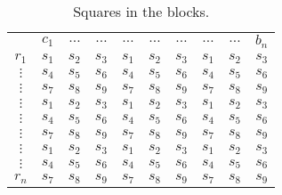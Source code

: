 \documentclass[11pt]{report}
\begin{document}
\begin{table}
\begin{center}
\begin{tabular}{ c| c c c| c c c| c c c|}
\multicolumn{1}{c}{} & $c_{1}$ &  $\dots$ & \multicolumn{1}{c}{$\dots$} & $\dots$ & $\dots$ & \multicolumn{1}{c}{$\dots$} & $\dots$ & $\dots$ & \multicolumn{1}{c}{$b_{n}$}\\ \cline{2-10}
$r_{1}$ & $s_{1}$ &  $s_{2}$ & $s_{3}$ & $s_{1}$ & $s_{2}$ & $s_{3}$ & $s_{1}$ & $s_{2}$ & $s_{3}$\\
$\vdots$ & $s_{4}$ & $s_{5}$ & $s_{6}$ & $s_{4}$ & $s_{5}$ & $s_{6}$ &  $s_{4}$ & $s_{5}$ & $s_{6}$\\
$\vdots$ & $s_{7}$ & $s_{8}$ & $s_{9}$ & $s_{7}$ & $s_{8}$ & $s_{9}$ & $s_{7}$ & $s_{8}$ & $s_{9}$\\ \cline{2-10}
$\vdots$ & $s_{1}$ &  $s_{2}$ & $s_{3}$ & $s_{1}$ & $s_{2}$ & $s_{3}$ & $s_{1}$ & $s_{2}$ & $s_{3}$\\
$\vdots$ & $s_{4}$ & $s_{5}$ & $s_{6}$ & $s_{4}$ & $s_{5}$ & $s_{6}$ &  $s_{4}$ & $s_{5}$ & $s_{6}$\\
$\vdots$ & $s_{7}$ & $s_{8}$ & $s_{9}$ & $s_{7}$ & $s_{8}$ & $s_{9}$ & $s_{7}$ & $s_{8}$ & $s_{9}$\\ \cline{2-10}
$\vdots$ & $s_{1}$ &  $s_{2}$ & $s_{3}$ & $s_{1}$ & $s_{2}$ & $s_{3}$ & $s_{1}$ & $s_{2}$ & $s_{3}$\\
$\vdots$ & $s_{4}$ & $s_{5}$ & $s_{6}$ & $s_{4}$ & $s_{5}$ & $s_{6}$ &  $s_{4}$ & $s_{5}$ & $s_{6}$\\
$r_{n}$ & $s_{7}$ & $s_{8}$ & $s_{9}$ & $s_{7}$ & $s_{8}$ & $s_{9}$ & $s_{7}$ & $s_{8}$ & $s_{9}$\\ \cline{2-10}
\end{tabular}
\end{center}
\label{Square}
\caption{Squares in the blocks.}
\end{table}
\end{document}
